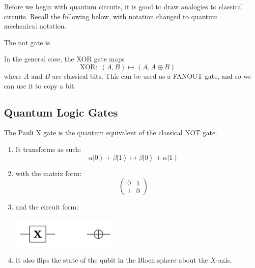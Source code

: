 \documentclass{article}
\newcommand{\ket}[1]{\ensuremath{\left|#1\right\rangle}}
\begin{document}
    Before we begin with quantum circuits, it is good to draw analogies to classical circuits. Recall the following below, with notation changed to quantum mechanical notation. 

    \begin{definition}
      The not gate is 
    \end{definition}

    \begin{definition}
      
    \end{definition}

    \begin{definition}
      In the general case, the XOR gate maps
      \begin{equation} 
        \text{XOR}: \; (A, B) \mapsto (A, A \oplus B)
      \end{equation}
      where $A$ and $B$ are classical bits. This can be used as a FANOUT gate, and so we can use it to copy a bit. 
    \end{definition}

  \subsection{Quantum Logic Gates}

    \begin{definition}[Pauli X]
      The Pauli X gate is the quantum equivalent of the classical NOT gate. 
      \begin{enumerate} 
        \item It transforms as such: 
          \begin{equation} 
            \alpha \ket{0} + \beta \ket{1} \mapsto \beta \ket{0} + \alpha \ket{1}
          \end{equation}
        \item with the matrix form: 
          \begin{equation} 
            \begin{pmatrix} 0 & 1 \\ 1 & 0 \end{pmatrix}
          \end{equation}
        \item and the circuit form: 
          \begin{center}
            \includegraphics[scale=0.5]{img/Pauli_X_gate.png}
          \end{center}
        \item It also flips the state of the qubit in the Bloch sphere about the $X$-axis. 
      \end{enumerate}
    \end{definition}
\end{document}
